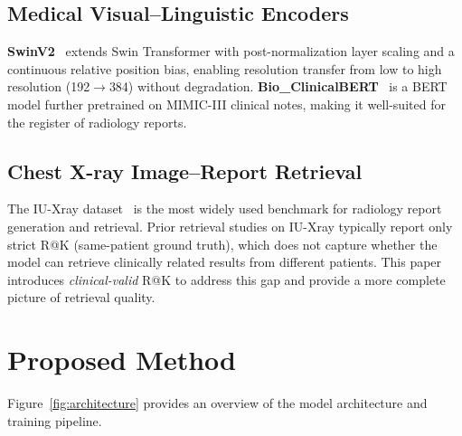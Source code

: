 \documentclass[11pt, a4paper]{article}
\begin{document}
\subsection{Medical Visual--Linguistic Encoders}

\textbf{SwinV2}~\citep{liu2022swin} extends Swin Transformer with
post-normalization layer scaling and a continuous relative position bias,
enabling resolution transfer from low to high resolution (192$\to$384)
without degradation.
\textbf{Bio\_ClinicalBERT}~\citep{alsentzer2019publicly} is a BERT model
further pretrained on MIMIC-III clinical notes, making it well-suited for
the register of radiology reports.

\subsection{Chest X-ray Image--Report Retrieval}

The IU-Xray dataset~\citep{demner2016preparing} is the most widely used
benchmark for radiology report generation and retrieval.
Prior retrieval studies on IU-Xray typically report only strict R@K
(same-patient ground truth), which does not capture whether the model can
retrieve clinically related results from different patients.
This paper introduces \emph{clinical-valid} R@K to address this gap and
provide a more complete picture of retrieval quality.

\section{Proposed Method}
\label{sec:method}

Figure~\ref{fig:architecture} provides an overview of the model architecture
and training pipeline.
\end{document}
